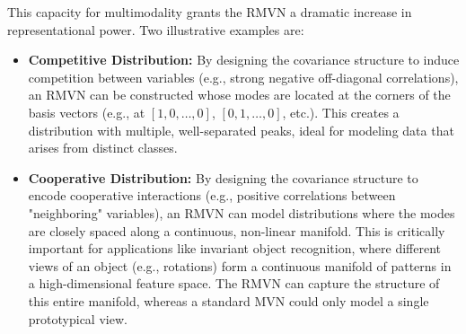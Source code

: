 This capacity for multimodality grants the RMVN a dramatic increase in representational power. Two illustrative examples are:
\begin{itemize}
    \item \textbf{Competitive Distribution:} By designing the covariance structure to induce competition between variables (e.g., strong negative off-diagonal correlations), an RMVN can be constructed whose modes are located at the corners of the basis vectors (e.g., at $[1, 0, \dots, 0]$, $[0, 1, \dots, 0]$, etc.). This creates a distribution with multiple, well-separated peaks, ideal for modeling data that arises from distinct classes.
    \item \textbf{Cooperative Distribution:} By designing the covariance structure to encode cooperative interactions (e.g., positive correlations between "neighboring" variables), an RMVN can model distributions where the modes are closely spaced along a continuous, non-linear manifold. This is critically important for applications like invariant object recognition, where different views of an object (e.g., rotations) form a continuous manifold of patterns in a high-dimensional feature space. The RMVN can capture the structure of this entire manifold, whereas a standard MVN could only model a single prototypical view.
\end{itemize}

\ifdefined\ispartofbook
\else
  
  
\fi
